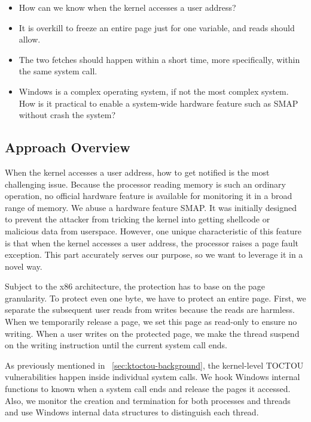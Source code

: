 \begin{itemize}
	\item How can we know when the kernel accesses a user address?
	\item It is overkill to freeze an entire page just for one variable, and reads should allow.
	\item The two fetches should happen within a short time, more specifically, within the same system call.
	\item Windows is a complex operating system, if not the most complex system. How is it practical to enable a system-wide hardware feature such as SMAP without crash the system?
\end{itemize}



\subsection{Approach Overview}


When the kernel accesses a user address, how to get notified is the most challenging issue. Because the processor reading memory is such an ordinary operation, no official hardware feature is available for monitoring it in a broad range of memory. We abuse a hardware feature SMAP. It was initially designed to prevent the attacker from tricking the kernel into getting shellcode or malicious data from userspace. However, one unique characteristic of this feature is that when the kernel accesses a user address, the processor raises a page fault exception. This part accurately serves our purpose, so we want to leverage it in a novel way.

Subject to the x86 architecture, the protection has to base on the page granularity. To protect even one byte, we have to protect an entire page.
First, we separate the subsequent user reads from writes because the reads are harmless.  When we temporarily release a page, we set this page as read-only to ensure no writing. When a user writes on the protected page, we make the thread suspend on the writing instruction until the current system call ends.

As previously mentioned in ~\autoref{sec:ktoctou-background}, the kernel-level TOCTOU vulnerabilities happen inside individual system calls. We hook Windows internal functions to known when a system call ends and release the pages it accessed. Also, we monitor the creation and termination for both processes and threads and use Windows internal data structures to distinguish each thread.

